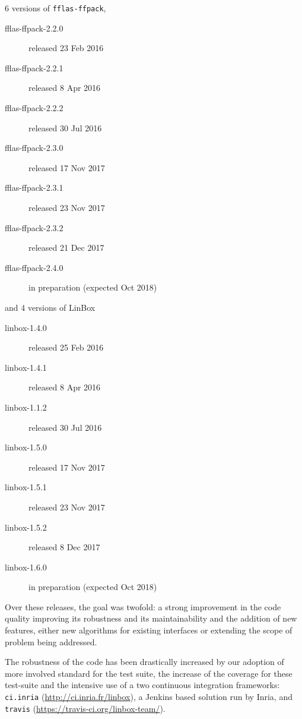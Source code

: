 \documentclass{deliverablereport}
\begin{document}
6 versions of \texttt{fflas-ffpack},
\begin{description}
  \item[fflas-ffpack-2.2.0] released 23 Feb 2016
  \item[fflas-ffpack-2.2.1] released 8 Apr 2016
  \item[fflas-ffpack-2.2.2] released 30 Jul 2016
  \item[fflas-ffpack-2.3.0] released 17 Nov 2017
  \item[fflas-ffpack-2.3.1] released 23 Nov 2017
  \item[fflas-ffpack-2.3.2] released 21 Dec 2017
  \item[fflas-ffpack-2.4.0] in preparation (expected Oct 2018)
\end{description}
and 4 versions of LinBox
\begin{description}
  \item[linbox-1.4.0] released 25 Feb 2016
  \item[linbox-1.4.1] released 8 Apr 2016
  \item[linbox-1.1.2] released 30 Jul 2016
  \item[linbox-1.5.0] released 17 Nov 2017
  \item[linbox-1.5.1] released 23 Nov 2017
  \item[linbox-1.5.2] released 8 Dec 2017
  \item[linbox-1.6.0] in preparation (expected Oct 2018)
\end{description}

Over these releases, the goal was twofold: a strong improvement in the code
quality improving its robustness and its maintainability and  the addition of new
features, either new algorithms for existing interfaces or extending the scope
of problem being addressed.

The robustness of the code has been drastically increased by our adoption of more
involved standard for the test suite, the increase of the coverage for these
test-suite and the intensive use of a two continuous integration frameworks:
\texttt{ci.inria} (\url{http://ci.inria.fr/linbox}), a Jenkins based solution run by Inria, and
\texttt{travis} (\url{https://travis-ci.org/linbox-team/}).
\end{document}
